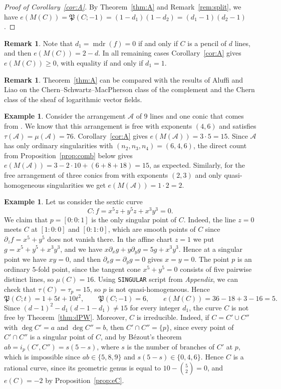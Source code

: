 \documentclass[11pt]{amsart}
\theoremstyle{definition}
\newtheorem{remark}[theorem]{Remark}
\newtheorem{example}[theorem]{Example}
\numberwithin{equation}{section}
\newcommand{\cA}{\mathcal{A}}
\newcommand{\Pfrak}{\mathfrak{P}}
\newcommand{\gadd}[1]{#1}
\DeclareMathOperator{\mdr}{mdr}
\begin{document}
\begin{proof}[Proof of Corollary~\ref{cor:A}]
By Theorem~\ref{thm:A} and Remark~\ref{rem:split}, we have $e(M(C))=\Pfrak(C;-1)=(1-d_1)(1-d_2)=(d_1-1)(d_2-1)$.
\end{proof}

\begin{remark}
Note that $d_1=\mdr(f)=0$ if and only if $C$ is a pencil of $d$ lines, and then $e(M(C))=2-d$.
In all remaining cases Corollary~\ref{cor:A} gives $e(M(C))\ge0$, with equality if and only if $d_1=1$.
\end{remark}

\begin{remark}
Theorem~\ref{thm:A} can be compared with the results of Aluffi \cite{Al} and Liao \cite{Li} on the Chern--Schwartz--MacPherson class of the complement and the Chern class of the sheaf of logarithmic vector fields.
\end{remark}

\begin{example}\label{ex:freeA}
Consider the arrangement $\cA$ of $9$ lines and one conic that comes from \cite[Example~3.3]{Po25}. We know that this arrangement is free with exponents $(4,6)$ and satisfies $\tau(\cA)=\mu(\cA)=76$.
Corollary~\ref{cor:A} gives $e(M(\cA))=3\cdot5=15$.
Since $\cA$ has only ordinary singularities with $(n_2,n_3,n_4)=(6,4,6)$, the direct count from Proposition~\ref{prop:comb} below gives $e(M(\cA))=3-2\cdot10+(6+8+18)=15$, as expected.
Similarly, for the free arrangement of three conics from \cite[Example~3.9]{Po25} with exponents $(2,3)$ \gadd{and only quasi-homogeneous singularities} we get $e(M(\cA))=1\cdot2=2$.
\end{example}

\begin{example}\label{ex:nonqh}
Let us consider the sextic curve
\[
C\colon f=x^5z+y^5z+x^3y^3=0 .
\]
We claim that $p=[0:0:1]$ is the only singular point of $C$.
Indeed, the line $z=0$ meets $C$ at $[1:0:0]$ and $[0:1:0]$, which are smooth points of $C$ since $\partial_zf=x^5+y^5$ does not vanish there.
In the affine chart $z=1$ we put $g=x^5+y^5+x^3y^3$, and we have $x\partial_xg+y\partial_yg=5g+x^3y^3$.
Hence at a singular point we have $xy=0$, and then $\partial_xg=\partial_yg=0$ gives $x=y=0$.
The point $p$ is an ordinary $5$-fold point, since the tangent cone $x^5+y^5=0$ consists of five pairwise distinct lines, so $\mu(C)=16$.
Using \texttt{SINGULAR} script from \textsl{Appendix}, we can check that $\tau(C)=\tau_p=15$, so $p$ is not quasi-homogeneous.
Hence
\[
\Pfrak(C;t)=1+5t+10t^2,\qquad \Pfrak(C;-1)=6,\qquad e(M(C))=36-18+3-16=5.
\]
Since $(d-1)^2-d_1(d-1-d_1)\neq15$ for every integer $d_1$, the curve $C$ is not free by Theorem~\ref{thm:dPW}.
Moreover, $C$ is irreducible.
Indeed, if $C=C'\cup C''$ with $\deg C'=a$ and $\deg C''=b$, then $C'\cap C''=\{p\}$, since every point of $C'\cap C''$ is a singular point of $C$, and by B\'ezout's theorem $ab=i_p(C',C'')=s(5-s)$, where $s$ is the number of branches of $C'$ at $p$, which is impossible since $ab\in\{5,8,9\}$ and $s(5-s)\in\{0,4,6\}$.
Hence $C$ is a rational curve, since its geometric genus is equal to $10-\binom52=0$, and $e(C)=-2$ by Proposition~\ref{prop:eC}.
\end{example}
\end{document}
